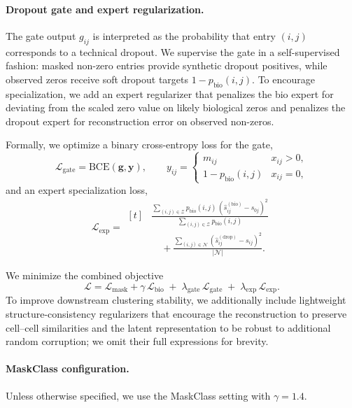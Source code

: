 \documentclass[sigconf,review]{acmart}
\theoremstyle{plain}
\theoremstyle{definition}
\theoremstyle{remark}
\begin{document}
\paragraph{Dropout gate and expert regularization.}
The gate output $g_{ij}$ is interpreted as the probability that entry $(i,j)$
corresponds to a technical dropout. We supervise the gate in a self-supervised
fashion: masked non-zero entries provide synthetic dropout positives, while
observed zeros receive soft dropout targets $1-p_{\mathrm{bio}}(i,j)$.
To encourage specialization, we add an expert regularizer that penalizes the
bio expert for deviating from the scaled zero value on likely biological zeros
and penalizes the dropout expert for reconstruction error on observed non-zeros.

Formally, we optimize a binary cross-entropy loss for the gate,
\[
\mathcal{L}_{\mathrm{gate}}=\mathrm{BCE}(\mathbf{g},\mathbf{y}),\qquad
y_{ij}=\begin{cases}
m_{ij} & x_{ij}>0,\\
1-p_{\mathrm{bio}}(i,j) & x_{ij}=0,
\end{cases}
\]
and an expert specialization loss,
\[
\mathcal{L}_{\mathrm{exp}}=
\begin{aligned}[t]
&\frac{\sum_{(i,j)\in\mathcal{Z}} p_{\mathrm{bio}}(i,j)\,(\hat{s}^{(\mathrm{bio})}_{ij}-s_{0j})^2}
      {\sum_{(i,j)\in\mathcal{Z}} p_{\mathrm{bio}}(i,j)}\\
&\quad+\frac{\sum_{(i,j)\in\mathcal{N}} (\hat{s}^{(\mathrm{drop})}_{ij}-s_{ij})^2}{|\mathcal{N}|}.
\end{aligned}
\]

We minimize the combined objective
\[
\mathcal{L}=\mathcal{L}_{\mathrm{mask}}+\gamma\,\mathcal{L}_{\mathrm{bio}}
\;+\;\lambda_{\mathrm{gate}}\,\mathcal{L}_{\mathrm{gate}}
\;+\;\lambda_{\mathrm{exp}}\,\mathcal{L}_{\mathrm{exp}}.
\]
To improve downstream clustering stability, we additionally include lightweight
structure-consistency regularizers that encourage the reconstruction to
preserve cell--cell similarities and the latent representation to be robust to
additional random corruption; we omit their full expressions for brevity.

\paragraph{MaskClass configuration.}
Unless otherwise specified, we use the MaskClass setting with $\gamma=1.4$.
\end{document}
